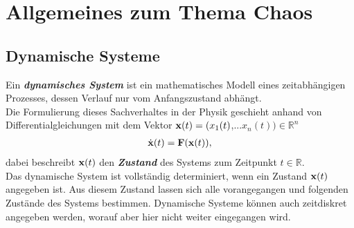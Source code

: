 

\section{Allgemeines zum Thema Chaos}
\label{sec:allgemeines}

\subsection{Dynamische Systeme}
\label{sub:dynamSys}
Ein \textit{\textbf{dynamisches System}} ist ein mathematisches Modell eines zeitabhängigen Prozesses, dessen Verlauf nur vom Anfangszustand abhängt. \citep{WikiDynSys}\\
Die Formulierung dieses Sachverhaltes in der Physik geschieht anhand von Differentialgleichungen mit dem Vektor $\vect{x}(t)=(x_1(t)$,...$x_n(t))\in\mathbb{R}^n$
\begin{gather}
    \dot{\vect{x}}(t)=\vect{F}(\vect{x}(t)),
    \label{eq:dynamDGL}
\end{gather}
dabei beschreibt $\vect{x}(t)$ den \textit{\textbf{Zustand}} des Systems zum Zeitpunkt $t\in\mathbb{R}$.\\
Das dynamische System ist vollständig determiniert, wenn ein Zustand $\vect{x}(t)$ angegeben ist. Aus diesem Zustand lassen sich alle vorangegangen und folgenden Zustände des Systems bestimmen. Dynamische Systeme können auch zeitdiskret angegeben werden, worauf aber hier nicht weiter eingegangen wird. \citep{Lueck}\\

